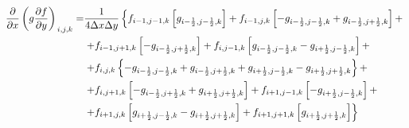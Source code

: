 \begin{equation*}
    \begin{split}
        \left.
            \frac
                {\partial}
                {\partial x}
            \left(
                g
                \frac
                    {\partial f}
                    {\partial y}
            \right)
        \right._{i, j, k}
        = &
        \frac
            {1}
            {4 \Delta x \Delta y}
        \left\{
            f_{i - 1, j - 1, k}
            \left[
                g_{i - \frac{1}{2}, j - \frac{1}{2}, k}
            \right]
            +
            f_{i - 1, j, k}
            \left[
                - g_{i - \frac{1}{2}, j - \frac{1}{2}, k}
                + g_{i - \frac{1}{2}, j + \frac{1}{2}, k}
            \right]
            +
        \right.
        \\ &
        \left.
            +
            f_{i - 1, j + 1, k}
            \left[
                - g_{i - \frac{1}{2}, j + \frac{1}{2}, k}
            \right]
            +
            f_{i, j - 1, k}
            \left[
                g_{i - \frac{1}{2}, j - \frac{1}{2}, k}
                - g_{i + \frac{1}{2}, j - \frac{1}{2}, k}
            \right]
            +
        \right.
        \\ &
        \left.
            +
            f_{i, j, k}
            \left\{
                - g_{i - \frac{1}{2}, j - \frac{1}{2}, k}
                + g_{i - \frac{1}{2}, j + \frac{1}{2}, k}
                + g_{i + \frac{1}{2}, j - \frac{1}{2}, k}
                - g_{i + \frac{1}{2}, j + \frac{1}{2}, k}
            \right\}
            +
        \right.
        \\ &
        \left.
            +
            f_{i, j + 1, k}
            \left[
                - g_{i - \frac{1}{2}, j + \frac{1}{2}, k}
                + g_{i + \frac{1}{2}, j + \frac{1}{2}, k}
            \right]
            +
            f_{i + 1, j - 1, k}
            \left[
                - g_{i + \frac{1}{2}, j - \frac{1}{2}, k}
            \right]
            +
        \right.
        \\ &
        \left.
            +
            f_{i + 1, j, k}
            \left[
                g_{i + \frac{1}{2}, j - \frac{1}{2}, k}
                - g_{i + \frac{1}{2}, j + \frac{1}{2}, k}
            \right]
            +
            f_{i + 1, j + 1, k}
            \left[
                g_{i + \frac{1}{2}, j + \frac{1}{2}, k}
            \right]
        \right\}
    \end{split}
\end{equation*}

